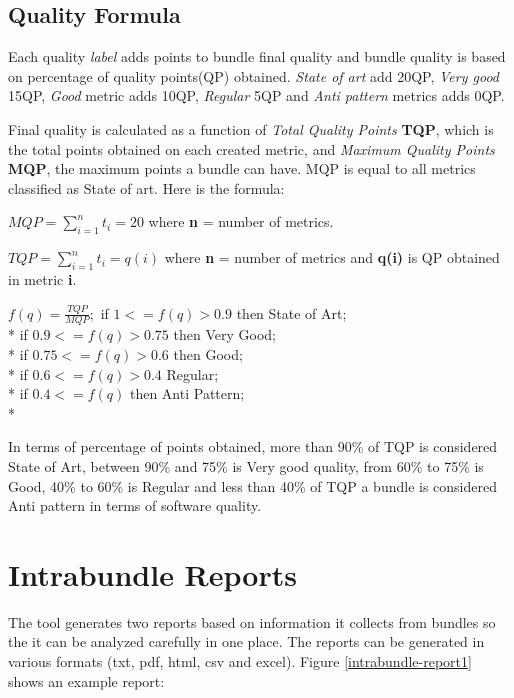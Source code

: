 \subsection{Quality Formula}

Each quality \emph{label} adds points to bundle final quality and bundle quality is based on percentage of quality points(QP) obtained. \emph{State of art} add 20QP, \emph{Very good} 15QP, \emph{Good} metric adds 10QP, \emph{Regular} 5QP and \emph{Anti pattern} metrics adds 0QP. 

Final quality is calculated as a function of \emph{Total Quality Points} \textbf{TQP}, which is the total points obtained on each created metric, and \emph{Maximum Quality Points} \textbf{MQP}, the maximum points a bundle can have. MQP is equal to all metrics classified as State of art. Here is the formula:\newline    

\(MQP = \sum_{i=1}^{n} t_i = 20 \) where \textbf{n} = number of metrics. \newline

\(TQP = \sum_{i=1}^{n} t_i = q(i) \) where \textbf{n} = number of metrics and \textbf{q(i)} is QP obtained in metric \textbf{i}. \newline

 
\(
f(q) = \frac{TQP}{MQP};
\)
\newline
\newline
 if \( 1 <= f(q) > 0.9 \) then State of Art; \\*
 if \( 0.9 <= f(q) > 0.75 \) then Very Good; \\*
 if \( 0.75 <= f(q) > 0.6 \) then Good; \\*
 if \( 0.6 <= f(q) > 0.4 \) Regular; \\*
 if \( 0.4 <= f(q) \) then Anti Pattern;\\*

In terms of percentage of points obtained, more than 90\% of TQP is considered State of Art, between 90\% and 75\% is Very good quality, from 60\% to 75\% is Good, 40\% to 60\% is Regular and less than 40\% of TQP a bundle is considered Anti pattern in terms of software quality. 


\section{Intrabundle Reports}
\label{sec:intrabundle-reports}
The tool generates two reports based on information it collects from bundles so the it can be analyzed carefully in one place. The reports can be generated in various formats (txt, pdf, html, csv and excel). Figure \ref{intrabundle-report1} shows an example report:  

